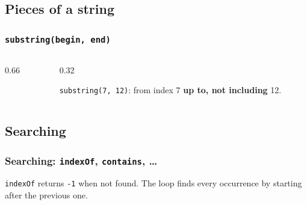 \documentclass[aspectratio=169,10pt,compress]{beamer}
\begin{document}
\subsection[Substring]{Pieces of a string}




\begin{frame}[t,fragile] \frametitle{\texttt{substring(begin, end)}}
  \begin{columns}[T]
    \begin{column}{0.66\textwidth}
    \end{column}
    \begin{column}{0.32\textwidth}
      \begin{center}
      \end{center}
      \small \texttt{substring(7, 12)}: from index 7 \textbf{up to, not including} 12.
      \vspace{0.3em}

    \end{column}
  \end{columns}
\end{frame}



\subsection[Search]{Searching}




\begin{frame}[t,fragile] \frametitle{Searching: \texttt{indexOf}, \texttt{contains}, \dots}

  \vspace{0.3em}
  \small \texttt{indexOf} returns \texttt{-1} when not found. The loop finds every occurrence by starting after the previous one.
\end{frame}
\end{document}
